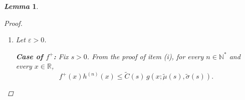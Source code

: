 \documentclass[review]{elsarticle}
\newtheorem{lemma}{\em Lemma}
\newcommand{\bN}{\mathbb{N}}
\begin{document}
\begin{lemma}
\begin{proof}
\begin{enumerate}
\begin{equation}
\widehat{\sigma}(s)=\overline{\sigma}(t_1),\qquad
\widehat{\mu}(s)=-\,\widehat{\mu}_+(-s)
= \overline{\mu}(t_1)+\frac{\overline{\sigma}(t_1)^2k}{s},
\end{equation}
\begin{equation}
\widehat{C}(s)=\overline{C}(t_1)\,\frac{\widehat{\sigma}(s)}{\overline{\sigma}(t_1)}\,
\exp\!\left(-\frac{(-s+\overline{\mu}(t_1))^2}{2\,\overline{\sigma}(t_1)^2}
+ k\ln(-s)
+ \frac{\widehat{\sigma}(s)^2}{2}\left(\frac{-s+\overline{\mu}(t_1)}{\overline{\sigma}(t_1)^2}+\frac{k}{s}\right)^{\!2}\right).
\end{equation}
This concludes the proof of (i).

    \item[(ii)]
    {\color{blue}
    Let $\varepsilon>0$.
    
    \textbf{Case of $f^+$:} Fix $s>0$. From the proof of item (i), for every $n\in\mathbb N^*$ and every $x\in\mathbb R$,
\begin{equation}
f^+(x)h^{(n)}(x)\le \widetilde C(s)\, g(x;\widetilde\mu(s),\widetilde\sigma(s)).
\end{equation}
    }


\end{enumerate}
\end{proof}
\end{lemma}
\end{document}
